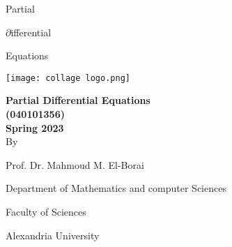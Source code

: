 \begingroup
{}
\par\sffamily\selectfont
\thispagestyle{empty}
\color{cover}
\begin{center}
    \vspace*{4cm}
    {\fontsize{50pt}{30pt}\selectfont\Acmefont
    Partial\par
    $\partial$ifferential\par
    Equations
    }
\end{center}
\endgroup

\newpage

\begingroup
\thispagestyle{empty}
\begin{center}
    \texttt{[image: collage logo.png]}
    \vspace*{1.5cm}
    \par
    {\fontsize{20pt}{30pt}\selectfont
    \textbf{Partial Differential Equations\\(040101356)\\Spring 2023}
    \\
    \vspace*{.75cm}
    By
    \vspace*{.75cm}
    
    Prof. Dr. Mahmoud M. El-Borai
    
    Department of Mathematics and computer Sciences
    
    Faculty of Sciences
    
    Alexandria University
    }
\end{center}

\restoregeometry
\endgroup
\newpage
\thispagestyle{empty}
\tableofcontents

\newpage
\setcounter{page}{1}